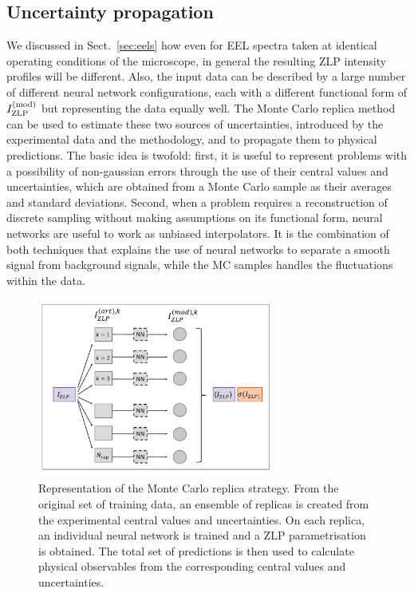 \subsection{Uncertainty propagation}
\label{sec:uncertaintypropagation}

We discussed in Sect.~\ref{sec:eels} how
even for EEL spectra taken at identical operating conditions of the microscope,
in general the resulting ZLP intensity profiles will be different.
%
Also, the input data can be described by a large number of different neural 
network configurations, each with a different functional form of $I_{\rm ZLP}^{(\rm mod)}$
but representing the data equally well.
%
The Monte Carlo replica method can be used to estimate these two sources of 
uncertainties, introduced by the experimental data and the methodology,
and to propagate them to physical predictions.
%
The basic idea is twofold:
first, it is useful to represent problems with a possibility of non-gaussian errors
through the use of their central values and uncertainties, which are obtained from a Monte Carlo sample
as their averages and standard deviations.
%
Second, when a problem requires a reconstruction of discrete sampling without making assumptions on its 
functional form, neural networks are useful to work as unbiased interpolators. 
%
It is the combination of both techniques that explains the use of neural networks to separate a smooth
signal from background signals, while the MC samples handles the fluctuations within the data.

\begin{figure}[h]
    \centering
    \includegraphics[width=0.7\textwidth]{plots/MCscheme.pdf}
    \caption{Representation of the Monte Carlo replica strategy. From the original set of training data,
    an ensemble of replicas is created from the experimental central values and uncertainties. 
    On each replica, an individual neural network is trained and a ZLP parametrisation is obtained.
    The total set of predictions is then used to calculate physical observables from the corresponding
    central values and uncertainties.}
    \label{fig:MCscheme}
\end{figure}

